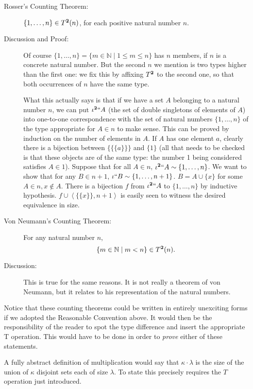\documentclass[12pt]{book}
\begin{document}
\begin{description}
\item[Rosser's Counting Theorem:] $\{1,\ldots,n\} \in T^{\bf 2}(n)$, for
each positive natural number $n$.

\item[Discussion and Proof:] Of course $\{1,\ldots,n\} = \{m \in
{\mathbb N}\mid 1 \leq m \leq n\}$ has $n$ members, if $n$ is a
concrete natural number.  But the second $n$ we mention is two types
higher than the first one: we fix this by affixing $T^{\bf 2}$ to the second
one, so that both occurrences of $n$ have the same type.

What this actually says is that if we have a set $A$ belonging to a
natural number $n$, we can put $\iota^{\bf 2}``A$ (the set of double
singletons of elements of $A$) into one-to-one correspondence with the
set of natural numbers $\{1,\ldots,n\}$ of the type appropriate for $A
\in n$ to make sense.  This can be proved by induction on the number
of elements in $A$.  If $A$ has one element $a$, clearly there is a
bijection between $\{\{\{a\}\}\}$ and $\{1\}$ (all that needs to be
checked is that these objects are of the same type: the number 1 being
considered satisfies $A \in 1$).  Suppose that for all $A \in n$,
$\iota^{\bf 2}``A \sim \{1,\ldots,n\}$.  We want to show that for any $B \in
n+1$, $\iota``B \sim \{1,\ldots,n+1\}$.  $B = A \cup \{x\}$ for some
$A \in n, x\not\in A$.  There is a bijection $f$ from $\iota^{\bf 2}``A$ to
$\{1,\ldots,n\}$ by inductive hypothesis.  $f \cup \left<\{\{x\}\},n+1\right>$
is easily seen to witness the desired equivalence in size.

\item[Von Neumann's Counting Theorem:] For any natural number $n$,
$$\{m \in {\mathbb N}\mid m<n\} \in T^{\bf 2}(n).$$

\item[Discussion:] This is true for the same reasons.  It is not
really a theorem of von Neumann, but it relates to his representation
of the natural numbers.

\end{description}

Notice that these counting theorems could be written in entirely
unexciting forms if we adopted the Reasonable Convention above.  It
would then be the responsibility of the reader to spot the type
difference and insert the appropriate T operation.  This would have to
be done in order to {\em prove\/} either of these statements.

A fully abstract definition of multiplication would say that
$\kappa\cdot\lambda$ is the size of the union of $\kappa$ disjoint
sets each of size $\lambda$.  To state this precisely requires the $T$
operation just introduced.
\end{document}
